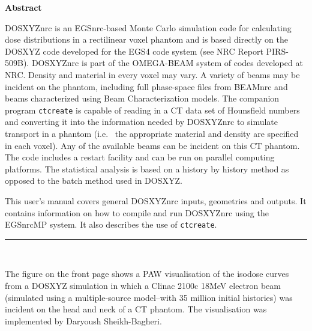 \documentclass[12pt,twoside]{article}      %
\newcommand{\indexm}[1]{\index{#1}}
\begin{document}
\newpage
\pagestyle{fancy}
\setcounter{page}{2}

\newpage

\setlength{\parindent}{0em}

\begin{center}
\begin{Large}
{\bf Abstract}
\end{Large}
\end{center}
\indexm{abstract}
DOSXYZnrc is an EGSnrc-based Monte Carlo simulation code for calculating
dose distributions in a rectilinear voxel phantom and is based directly
on the DOSXYZ code developed for the EGS4 code system (see NRC Report
PIRS-509B). DOSXYZnrc is part of the OMEGA-BEAM system of codes developed
at NRC.  Density and material in every voxel may vary.  A variety of beams
may be incident on the phantom, including full phase-space files from
BEAMnrc  and beams characterized using Beam Characterization models. The
companion program {\tt ctcreate} is capable of reading in a CT data set
of Hounsfield numbers and converting it into the information needed by
DOSXYZnrc to simulate transport in a phantom (i.e.  ~the appropriate
material and density are specified in each voxel).  Any of the available
beams can be incident on this CT phantom.  The code includes a restart
facility and can be run on parallel computing platforms.  The statistical
analysis is based on a history by history method as opposed to the batch
method used in DOSXYZ.

This user's manual covers general DOSXYZnrc inputs, geometries and outputs.  It
contains information on how to compile and run DOSXYZnrc using the EGSnrcMP
system. It also describes
the use of {\tt ctcreate}.

\begin{latexonly}
\vspace{11.5cm}
\end{latexonly}

\rule{16.3cm}{0.6mm}\\
\begin{small}
The figure on the front page shows a PAW visualisation of the isodose
curves from a DOSXYZ simulation in which a Clinac 2100c 18MeV electron
beam (simulated using a multiple-source model--with 35 million initial
histories) was
incident on the head and neck of a CT phantom.  The visualisation was
implemented by Daryoush Sheikh-Bagheri.

\end{small}
\end{document}
